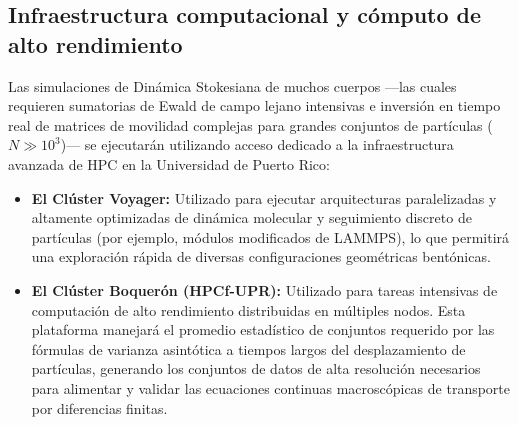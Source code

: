 \subsection{Infraestructura computacional y cómputo de alto rendimiento}
Las simulaciones de Dinámica Stokesiana de muchos cuerpos ---las cuales requieren sumatorias de Ewald de campo lejano intensivas e inversión en tiempo real de matrices de movilidad complejas para grandes conjuntos de partículas ($N \gg 10^3$)--- se ejecutarán utilizando acceso dedicado a la infraestructura avanzada de HPC en la Universidad de Puerto Rico:
\begin{itemize}
    \item \textbf{El Clúster Voyager:} Utilizado para ejecutar arquitecturas paralelizadas y altamente optimizadas de dinámica molecular y seguimiento discreto de partículas (por ejemplo, módulos modificados de LAMMPS), lo que permitirá una exploración rápida de diversas configuraciones geométricas bentónicas.
    \item \textbf{El Clúster Boquer\'{o}n (HPCf-UPR):} Utilizado para tareas intensivas de computación de alto rendimiento distribuidas en múltiples nodos. Esta plataforma manejará el promedio estadístico de conjuntos requerido por las fórmulas de varianza asintótica a tiempos largos del desplazamiento de partículas, generando los conjuntos de datos de alta resolución necesarios para alimentar y validar las ecuaciones continuas macroscópicas de transporte por diferencias finitas.
\end{itemize}
